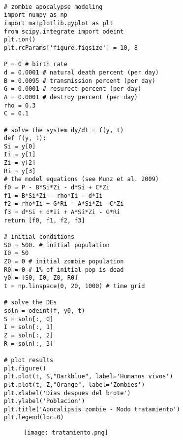 \documentclass[a4 paper]{article}
\numberwithin{equation}{section}
\newcommand{\0}{\mathbf{0}}
\begin{document}
\begin{verbatim}

# zombie apocalypse modeling
import numpy as np
import matplotlib.pyplot as plt
from scipy.integrate import odeint
plt.ion()
plt.rcParams['figure.figsize'] = 10, 8

P = 0 # birth rate
d = 0.0001 # natural death percent (per day)
B = 0.0095 # transmission percent (per day)
G = 0.0001 # resurect percent (per day)
A = 0.0001 # destroy percent (per day)
rho = 0.3
C = 0.1 

# solve the system dy/dt = f(y, t)
def f(y, t):
Si = y[0]
Ii = y[1]
Zi = y[2]
Ri = y[3]
# the model equations (see Munz et al. 2009)
f0 = P - B*Si*Zi - d*Si + C*Zi
f1 = B*Si*Zi - rho*Ii - d*Ii
f2 = rho*Ii + G*Ri - A*Si*Zi -C*Zi
f3 = d*Si + d*Ii + A*Si*Zi - G*Ri
return [f0, f1, f2, f3]

# initial conditions
S0 = 500. # initial population
I0 = 50
Z0 = 0 # initial zombie population
R0 = 0 # 1% of initial pop is dead
y0 = [S0, I0, Z0, R0]
t = np.linspace(0, 20, 1000) # time grid

# solve the DEs
soln = odeint(f, y0, t)
S = soln[:, 0]
I = soln[:, 1]
Z = soln[:, 2]
R = soln[:, 3]

# plot results
plt.figure()
plt.plot(t, S,"Darkblue", label='Humanos vivos')
plt.plot(t, Z,"Orange", label='Zombies')
plt.xlabel('Dias despues del brote')
plt.ylabel('Poblacion')
plt.title('Apocalipsis zombie - Modo tratamiento')
plt.legend(loc=0)

\end{verbatim}
\newpage
\begin{figure}[!ht]
  \centering
      \texttt{[image: tratamiento.png]}
  \caption{}
\end{figure}
\end{document}
